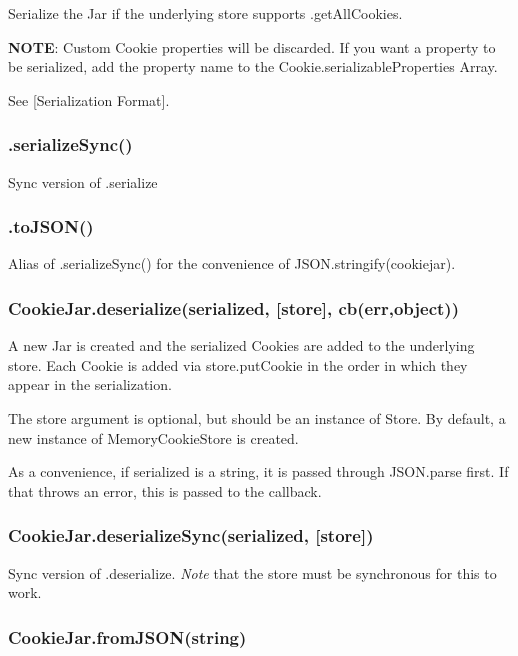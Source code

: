 Serialize the Jar if the underlying store supports {\ttfamily .get\+All\+Cookies}.

{\bfseries N\+O\+TE}\+: Custom {\ttfamily Cookie} properties will be discarded. If you want a property to be serialized, add the property name to the {\ttfamily Cookie.\+serializable\+Properties} Array.

See \mbox{[}Serialization Format\mbox{]}.

\subsubsection*{{\ttfamily .serialize\+Sync()}}

Sync version of .serialize

\subsubsection*{{\ttfamily .to\+J\+S\+O\+N()}}

Alias of .serialize\+Sync() for the convenience of {\ttfamily J\+S\+O\+N.\+stringify(cookiejar)}.

\subsubsection*{{\ttfamily Cookie\+Jar.\+deserialize(serialized, \mbox{[}store\mbox{]}, cb(err,object))}}

A new Jar is created and the serialized Cookies are added to the underlying store. Each {\ttfamily Cookie} is added via {\ttfamily store.\+put\+Cookie} in the order in which they appear in the serialization.

The {\ttfamily store} argument is optional, but should be an instance of {\ttfamily Store}. By default, a new instance of {\ttfamily Memory\+Cookie\+Store} is created.

As a convenience, if {\ttfamily serialized} is a string, it is passed through {\ttfamily J\+S\+O\+N.\+parse} first. If that throws an error, this is passed to the callback.

\subsubsection*{{\ttfamily Cookie\+Jar.\+deserialize\+Sync(serialized, \mbox{[}store\mbox{]})}}

Sync version of {\ttfamily .deserialize}. {\itshape Note} that the {\ttfamily store} must be synchronous for this to work.

\subsubsection*{{\ttfamily Cookie\+Jar.\+from\+J\+S\+O\+N(string)}}

